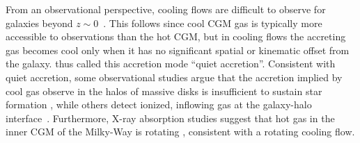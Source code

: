 \documentclass[fleqn,usenatbib]{mnras}
\newcommand{\Rvir}{R_{\rm vir}}
\begin{document}

From an observational perspective, cooling flows are difficult to observe for galaxies beyond $z\sim0$~\citep{Putman2012}.
This follows since cool CGM gas is typically more accessible to observations than the hot CGM, but in cooling flows the accreting gas becomes cool only when it has no significant spatial or kinematic offset from the galaxy.
\citeauthor{Putman2012} thus called this accretion mode ``quiet accretion''. 
Consistent with quiet accretion, some observational studies argue that the accretion implied by cool gas observe in the halos of massive disks is insufficient to sustain star formation \citep[e.g.][]{Sancisi2008, Binney+09}, while others detect ionized, inflowing gas at the galaxy-halo interface~\citep{Zheng2017}. Furthermore, X-ray absorption studies suggest that hot gas in the inner CGM of the Milky-Way is rotating \citep{HodgesKluck2016}, consistent with a rotating cooling flow. 
\end{document}
